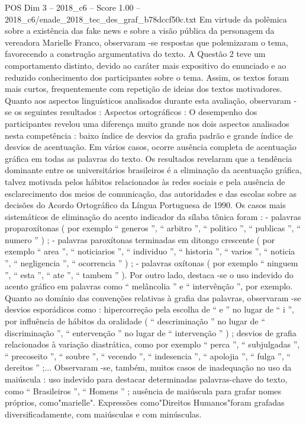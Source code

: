 \begin{textsample}{POS Dim 3 – 2018\_c6 – Score 1.00 – 2018\_c6/enade\_2018\_tec\_des\_graf\_b78dccf50c.txt}
Em virtude da polêmica sobre a existência das fake news e sobre a visão pública da personagem da vereadora Marielle Franco, observaram -se respostas que polemizaram o tema, favorecendo a construção argumentativa do texto.
A Questão 2 teve um comportamento distinto, devido ao caráter mais expositivo do enunciado e ao reduzido conhecimento dos participantes sobre o tema.
Assim, os textos foram mais curtos, frequentemente com repetição de ideias dos textos motivadores.
Quanto aos aspectos linguísticos analisados durante esta avaliação, observaram -se os seguintes resultados : Aspectos ortográficos : O desempenho dos participantes revelou uma diferença muito grande nos dois aspectos analisados nesta competência : baixo índice de desvios da grafia padrão e grande índice de desvios de acentuação.
Em vários casos, ocorre ausência completa de acentuação gráfica em todas as palavras do texto.
Os resultados revelaram que a tendência dominante entre os universitários brasileiros é a eliminação da acentuação gráfica, talvez motivada pelos hábitos relacionados às redes sociais e pela ausência de esclarecimento dos meios de comunicação, das autoridades e das escolas sobre as decisões do Acordo Ortográfico da Língua Portuguesa de 1990.
Os casos mais sistemáticos de eliminação do acento indicador da sílaba tônica foram : - palavras proparoxítonas ( por exemplo “ generos ”, “ arbitro ”, “ politico ”, “ publicas ”, “ numero ” ) ; - palavras paroxítonas terminadas em ditongo crescente ( por exemplo “ area ”, “ noticiarios ”, “ individuo ”, “ historia ”, “ varios ”, “ noticia ”, “ negligencia ”, “ ocorrencia ” ) ; - palavras oxítonas ( por exemplo “ ninguem ”, “ esta ”, “ ate ”, “ tambem ” ).
Por outro lado, destaca -se o uso indevido do acento gráfico em palavras como “ melâncolia ” e “ intervênção ”, por exemplo.
Quanto ao domínio das convenções relativas à grafia das palavras, observaram -se desvios esporádicos como : hipercorreção pela escolha de “ e ” no lugar de “ i ”, por influência de hábitos da oralidade ( “ descriminação ” no lugar de “ discriminação ”, “ entervenção ” no lugar de “ intervenção ” ) ; desvios de grafia relacionados à variação diastrática, como por exemplo “ perca ”, “ subjulgadas ”, “ precoseito ”, “ soubre ”, “ vecendo ”, “ indesencia ”, “ apolojia ”, “ fulga ”, “ dereitos ” ;...
Observaram -se, também, muitos casos de inadequação no uso da maiúscula : uso indevido para destacar determinadas palavras-chave do texto, como “ Brasileiros ”, “ Homens ” ; ausência de maiúscula para grafar nomes próprios, como"marielle".
Expressões como"Direitos Humanos"foram grafadas diversificadamente, com maiúsculas e com minúsculas.

\end{textsample}
